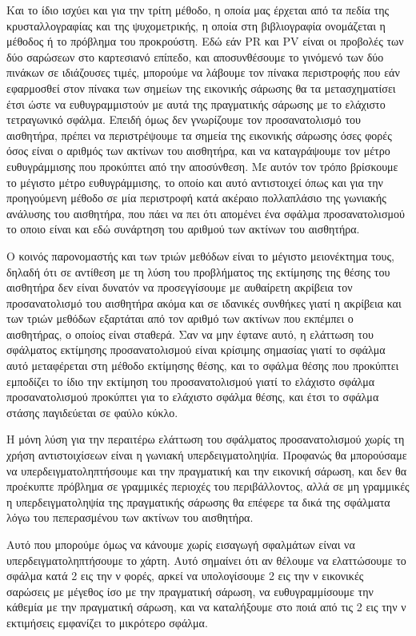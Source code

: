 \documentclass[a4paper,10pt]{article}
\begin{document}
Και το ίδιο ισχύει και για την τρίτη μέθοδο, η οποία μας έρχεται από τα πεδία
της κρυσταλλογραφίας και της ψυχομετρικής, η οποία στη βιβλιογραφία ονομάζεται
η μέθοδος ή το πρόβλημα του προκρούστη. Εδώ εάν PR και PV είναι οι προβολές των
δύο σαρώσεων στο καρτεσιανό επίπεδο, και αποσυνθέσουμε το γινόμενό των δύο
πινάκων σε ιδιάζουσες τιμές, μπορούμε να λάβουμε τον πίνακα περιστροφής που
εάν εφαρμοσθεί στον πίνακα των σημείων της εικονικής σάρωσης θα τα μετασχηματίσει
έτσι ώστε να ευθυγραμμιστούν με αυτά της πραγματικής σάρωσης με το ελάχιστο
τετραγωνικό σφάλμα. Επειδή όμως δεν γνωρίζουμε τον προσανατολισμό του
αισθητήρα, πρέπει να περιστρέψουμε τα σημεία της εικονικής σάρωσης όσες φορές
όσος είναι ο αριθμός των ακτίνων του αισθητήρα, και να καταγράψουμε τον μέτρο
ευθυγράμμισης που προκύπτει από την αποσύνθεση. Με αυτόν τον τρόπο βρίσκουμε
το μέγιστο μέτρο ευθυγράμμισης, το οποίο και αυτό αντιστοιχεί όπως και για την
προηγούμενη μέθοδο σε μία περιστροφή κατά ακέραιο πολλαπλάσιο της γωνιακής
ανάλυσης του αισθητήρα, που πάει να πει ότι απομένει ένα σφάλμα προσανατολισμού
το οποιο είναι και εδώ συνάρτηση του αριθμού των ακτίνων του αισθητήρα.

Ο κοινός παρονομαστής και των τριών μεθόδων είναι το μέγιστο μειονέκτημα τους,
δηλαδή ότι σε αντίθεση με τη λύση του προβλήματος της εκτίμησης της θέσης του
αισθητήρα δεν είναι δυνατόν να προσεγγίσουμε με αυθαίρετη ακρίβεια τον
προσανατολισμό του αισθητήρα ακόμα και σε ιδανικές συνθήκες γιατί η ακρίβεια
και των τριών μεθόδων εξαρτάται από τον αριθμό των ακτίνων που εκπέμπει ο
αισθητήρας, ο οποίος είναι σταθερά.  Σαν να μην έφτανε αυτό, η ελάττωση του
σφάλματος εκτίμησης προσανατολισμού είναι κρίσιμης σημασίας γιατί το σφάλμα
αυτό μεταφέρεται στη μέθοδο εκτίμησης θέσης, και το σφάλμα θέσης που προκύπτει
εμποδίζει το ίδιο την εκτίμηση του προσανατολισμού γιατί το ελάχιστο σφάλμα
προσανατολισμού προκύπτει για το ελάχιστο σφάλμα θέσης, και έτσι το σφάλμα
στάσης παγιδεύεται σε φαύλο κύκλο.

Η μόνη λύση για την περαιτέρω ελάττωση του σφάλματος προσανατολισμού χωρίς τη
χρήση αντιστοιχίσεων είναι η γωνιακή υπερδειγματοληψία. Προφανώς θα μπορούσαμε
να υπερδειγματοληπτήσουμε και την πραγματική και την εικονική σάρωση, και δεν
θα προέκυπτε πρόβλημα σε γραμμικές περιοχές του περιβάλλοντος,
αλλά σε μη γραμμικές η υπερδειγματοληψία της πραγματικής σάρωσης θα επέφερε τα
δικά της σφάλματα λόγω του πεπερασμένου των ακτίνων του αισθητήρα.

Αυτό που μπορούμε όμως να κάνουμε χωρίς εισαγωγή σφαλμάτων είναι να
υπερδειγματοληπτήσουμε το χάρτη. Αυτό σημαίνει ότι αν θέλουμε να ελαττώσουμε το
σφάλμα κατά 2 εις την ν φορές, αρκεί να υπολογίσουμε 2 εις την ν εικονικές
σαρώσεις με μέγεθος ίσο με την πραγματική σάρωση, να ευθυγραμμίσουμε την κάθεμία
με την πραγματική σάρωση, και να καταλήξουμε στο ποιά από τις 2 εις την ν
εκτιμήσεις εμφανίζει το μικρότερο σφάλμα.
\end{document}
